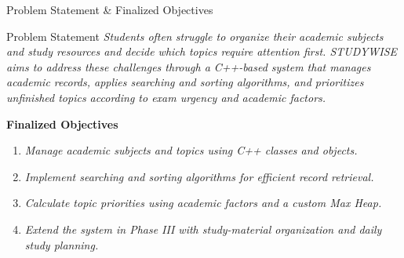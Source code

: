 \documentclass[aspectratio=169,11pt]{beamer}
\newcommand{\placeholder}[1]{%
\textit{\color{GEUGrey}#1}
}
\begin{document}
\begin{frame}{Problem Statement \& Finalized Objectives}
\vspace{-6mm}
\begin{block}{Problem Statement}
\placeholder{Students often struggle to organize their academic subjects and study resources and decide which topics require attention first. STUDYWISE aims to address these challenges through a C++-based system that manages academic records, applies searching and sorting algorithms, and prioritizes unfinished topics according to exam urgency and academic factors.}


\end{block}

\vspace{1mm}

\textbf{\color{GEUBlue}Finalized Objectives}

\begin{enumerate}\itemsep3pt
\item \placeholder{Manage academic subjects and topics using C++ classes and objects.}
\item \placeholder{Implement searching and sorting algorithms for efficient record retrieval.}
\item \placeholder{Calculate topic priorities using academic factors and a custom Max Heap.}
\item \placeholder{Extend the system in Phase III with study-material organization and daily study planning.}
\end{enumerate}

\vfill



\end{frame}
\end{document}
